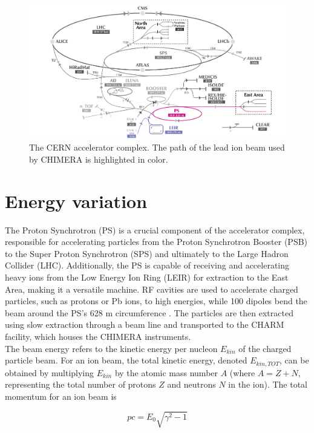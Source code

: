 \documentclass{cernatsnote}
\begin{document}
\begin{figure}[!htb]
\centering
\includegraphics[width=1.0\textwidth]{images/CCC_eastt8_small.png}
\caption{The CERN accelerator complex. The path of the lead ion beam used by CHIMERA is highlighted in color.}
\label{fig:CCC}
\end{figure}


\section{Energy variation}

The Proton Synchrotron (PS) is a crucial component of the accelerator complex, responsible for accelerating particles from the Proton Synchrotron Booster (PSB) to the Super Proton Synchrotron (SPS) and ultimately to the Large Hadron Collider (LHC). Additionally, the PS is capable of receiving and accelerating heavy ions from the Low Energy Ion Ring (LEIR) for extraction to the East Area, making it a versatile machine. RF cavities are used to accelerate charged particles, such as protons or Pb ions, to high energies, while 100 dipoles bend the beam around the PS's 628 m circumference \cite{gilardoni_fifty_2011}. The particles are then extracted using slow extraction through a beam line and transported to the CHARM facility, which houses the CHIMERA instruments.
\\

The beam energy refers to the kinetic energy per nucleon $E_{kin}$ of the charged particle beam. For an ion beam, the total kinetic energy, denoted $E_{kin, TOT}$, can be obtained by multiplying $E_{kin}$ by the atomic mass number $A$ (where $A = Z + N$, representing the total number of protons $Z$ and neutrons $N$ in the ion).  The total momentum for an ion beam is \cite{chao_handbook_2013}

$$pc={E_{0}\sqrt{\gamma^{2}-1}}$$
\end{document}
